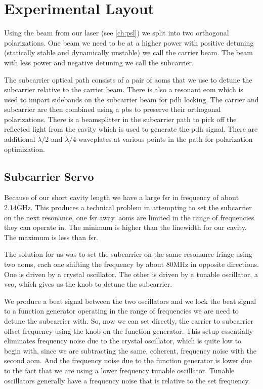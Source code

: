 \section{Experimental Layout}
Using the beam from our laser (see \ref{ch:psl}) we split into two orthogonal
polarizations. One beam we need to be at a higher power with positive detuning
(statically stable and dynamically unstable) we call the carrier beam. The
beam with less power and negative detuning we call the subcarrier.

The subcarrier optical path consists of a pair of \ac{aom}s that we use to
detune the subcarrier relative to the carrier beam.
There is also a resonant
\ac{eom} which is used to impart sidebands on the subcarrier beam for \ac{pdh}
locking.
The carrier and subcarrier are then combined using a \ac{pbs} to preserve their
orthogonal polarizations. There is a beamsplitter in the subcarrier path to pick
off the reflected light from the cavity which is used to generate the \ac{pdh}
signal. There are additional $\lambda/2$ and $\lambda/4$ waveplates at various
points in the path for polarization optimization.

\subsection{Subcarrier Servo}
Because of our short cavity length we have a large \ac{fsr} in frequency of
about 2.14GHz.
This produces a technical problem in attempting to set the
subcarrier on the next resonance, one \ac{fsr} away.
\ac{aom}s are limited in the range of frequencies they can operate in.
The minimum is higher than the linewidth for our cavity.
The maximum is less than \ac{fsr}.

The solution for us was to set the subcarrier on the same resonance fringe
using two \ac{aom}s, each one shifting the frequency by about 80MHz in
opposite directions.
One is driven by a crystal oscillator.
The other is driven by a tunable oscillator, a \ac{vco}, which gives us the
knob to detune the subcarrier.

We produce a beat signal between the two oscillators and we lock the beat
signal to a function generator operating in the range of frequencies we are
need to detune the subcarrier with. So, now we can set directly, the carrier
to subcarrier offset frequency using the knob on the function generator.
This setup essentially eliminates frequency noise due to the crystal
oscillator, which is quite low to begin with, since we are subtracting the
same, coherent, frequency noise with the second \ac{aom}.
And the frequency noise due to the function generator is lower due to the
fact that we are using a lower frequency tunable oscillator.
Tunable oscillators generally have a frequency noise that is relative to the
set frequency.


